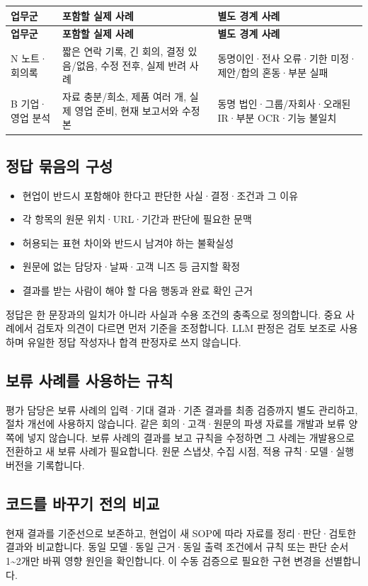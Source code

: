 \documentclass[a4paper,10pt]{article}
\newcommand{\Hline}{\noalign{\hrule height 1.5pt}}
\begin{document}
{\fontsize{9.2}{13.616}\selectfont
\begin{longtable}{!{\vrule width 1.5pt}L{29.98mm}|L{67.85mm}|L{59.96mm}!{\vrule width 1.5pt}}
\Hline{} \textbf{업무군} & \textbf{포함할 실제 사례} & \textbf{별도 경계 사례}\\\hline\endfirsthead
\Hline{} \textbf{업무군} & \textbf{포함할 실제 사례} & \textbf{별도 경계 사례}\\\hline\endhead
\hline\endfoot\Hline\endlastfoot
N 노트·회의록 & 짧은 연락 기록, 긴 회의, 결정 있음/없음, 수정 전후, 실제 반려 사례 & 동명이인·전사 오류·기한 미정·제안/합의 혼동·부분 실패\\\hline
B 기업·영업 분석 & 자료 충분/희소, 제품 여러 개, 실제 영업 준비, 현재 보고서와 수정본 & 동명 법인·그룹/자회사·오래된 IR·부분 OCR·기능 불일치\\\hline
\end{longtable}}
\subsection*{정답 묶음의 구성}
\begin{itemize}
\item 현업이 반드시 포함해야 한다고 판단한 사실·결정·조건과 그 이유
\item 각 항목의 원문 위치·URL·기간과 판단에 필요한 문맥
\item 허용되는 표현 차이와 반드시 남겨야 하는 불확실성
\item 원문에 없는 담당자·날짜·고객 니즈 등 금지할 확정
\item 결과를 받는 사람이 해야 할 다음 행동과 완료 확인 근거
\end{itemize}
정답은 한 문장과의 일치가 아니라 사실과 수용 조건의 충족으로 정의합니다. 중요 사례에서 검토자 의견이 다르면 먼저 기준을 조정합니다. LLM 판정은 검토 보조로 사용하며 유일한 정답 작성자나 합격 판정자로 쓰지 않습니다.


\subsection*{보류 사례를 사용하는 규칙}
평가 담당은 보류 사례의 입력·기대 결과·기존 결과를 최종 검증까지 별도 관리하고, 절차 개선에 사용하지 않습니다. 같은 회의·고객·원문의 파생 자료를 개발과 보류 양쪽에 넣지 않습니다. 보류 사례의 결과를 보고 규칙을 수정하면 그 사례는 개발용으로 전환하고 새 보류 사례가 필요합니다. 원문 스냅샷, 수집 시점, 적용 규칙·모델·실행 버전을 기록합니다.


\subsection*{코드를 바꾸기 전의 비교}
현재 결과를 기준선으로 보존하고, 현업이 새 SOP에 따라 자료를 정리·판단·검토한 결과와 비교합니다. 동일 모델·동일 근거·동일 출력 조건에서 규칙 또는 판단 순서 1\textasciitilde{}2개만 바꿔 영향 원인을 확인합니다. 이 수동 검증으로 필요한 구현 변경을 선별합니다.
\end{document}
